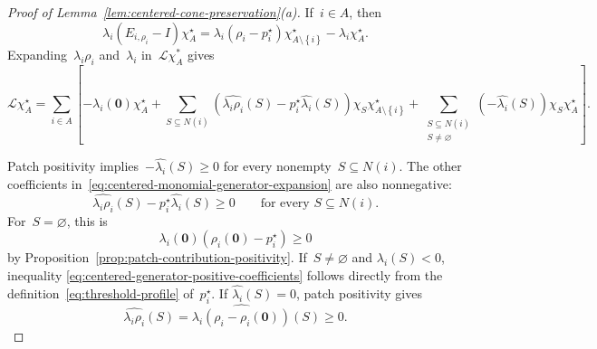 \documentclass[EJP,preprint,NODS,nobera]{ejpecp}
\newcommand{\bb}[1]{\left(#1\right)}
\newcommand{\Cb}[1]{\left[#1\right]}
\newcommand{\cb}[1]{\left\{#1\right\}}
\newcommand{\vn}{\varnothing}
\newcommand{\mb}[1]{\mathbf{#1}}
\newcommand{\Lcal}{\mathcal{L}}
\begin{document}
\begin{proof}[Proof of Lemma~\ref{lem:centered-cone-preservation}\textup{(a)}]
If~$i\in A$, then
\begin{equation*}
\lambda_i\bb{E_{i,\rho_i}-I}\chi_A^\star
=
\lambda_i\bb{\rho_i-p_i^\star}\chi_{A\setminus\cb{i}}^\star
-
\lambda_i\chi_A^\star.
\end{equation*}
Expanding~$\lambda_i\rho_i$ and~$\lambda_i$ in~$\mathcal{L}\chi_A^*$ gives
\begin{equation}
\label{eq:centered-monomial-generator-expansion}
\Lcal\chi_A^\star
=
\sum_{i\in A}\Cb{
-\lambda_i(\mb 0)\chi_A^\star
+
\sum_{S\subseteq N(i)}
\bb{
\widehat{\lambda_i\rho_i}(S)
-
p_i^\star\widehat{\lambda_i}(S)
}
\chi_S\chi_{A\setminus\cb{i}}^\star
+
\sum_{\substack{S\subseteq N(i)\\S\neq\vn}}
\bb{-\widehat{\lambda_i}(S)}
\chi_S\chi_A^\star
}.
\end{equation}

Patch positivity implies~$-\widehat{\lambda_i}(S)\geq0$ for every nonempty~$S\subseteq N(i)$.
The other coefficients in~\eqref{eq:centered-monomial-generator-expansion}
are also nonnegative:
\begin{equation}
\label{eq:centered-generator-positive-coefficients}
\widehat{\lambda_i\rho_i}(S)
-
p_i^\star\widehat{\lambda_i}(S)
\geq0
\qquad
\text{for every }S\subseteq N(i).
\end{equation}
For~$S=\vn$, this is
\begin{equation*}
\lambda_i(\mb 0)
\bb{\rho_i(\mb 0)-p_i^\star}
\geq0
\end{equation*}
by Proposition~\ref{prop:patch-contribution-positivity}. If~$S\neq\vn$ and
$\widehat{\lambda_i}(S)<0$, inequality
\eqref{eq:centered-generator-positive-coefficients} follows directly from the
definition~\eqref{eq:threshold-profile} of~$p_i^\star$. If
$\widehat{\lambda_i}(S)=0$, patch positivity gives
\begin{equation*}
\widehat{\lambda_i\rho_i}(S)
=
\widehat{\lambda_i\bb{\rho_i-\rho_i(\mb 0)}}(S)
\geq0.
\end{equation*}


\end{proof}
\end{document}
